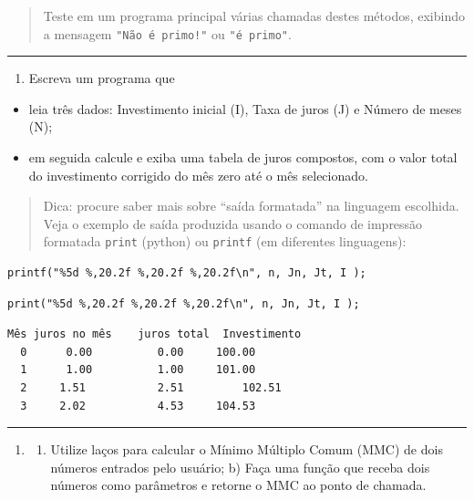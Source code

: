 \documentclass[12pt,a4paper]{article}
\renewcommand{\linethickness}{0.05em}
\providecommand{\tightlist}{%
      \setlength{\itemsep}{0pt}\setlength{\parskip}{0pt}}
\begin{document}
\begin{quote}
Teste em um programa principal várias chamadas destes métodos, exibindo
a mensagem \texttt{"Não\ é\ primo!"} ou \texttt{"é\ primo"}.
\end{quote}

    \begin{center}\rule{0.5\linewidth}{\linethickness}\end{center}

\begin{enumerate}
\def\labelenumi{\arabic{enumi}.}
\setcounter{enumi}{3}
\tightlist
\item
  Escreva um programa que
\end{enumerate}

\begin{itemize}
\tightlist
\item
  leia três dados: Investimento inicial (I), Taxa de juros (J) e Número
  de meses (N);
\item
  em seguida calcule e exiba uma tabela de juros compostos, com o valor
  total do investimento corrigido do mês zero até o mês selecionado.
\end{itemize}

\begin{quote}
Dica: procure saber mais sobre ``saída formatada'' na linguagem
escolhida. Veja o exemplo de saída produzida usando o comando de
impressão formatada \texttt{print} (python) ou \texttt{printf} (em
diferentes linguagens):
\end{quote}

    \begin{verbatim}
printf("%5d %,20.2f %,20.2f %,20.2f\n", n, Jn, Jt, I );
\end{verbatim}

    \begin{verbatim}
print("%5d %,20.2f %,20.2f %,20.2f\n", n, Jn, Jt, I );
\end{verbatim}

    \begin{verbatim}
Mês juros no mês    juros total  Investimento
  0      0.00          0.00     100.00
  1      1.00          1.00     101.00
  2     1.51           2.51         102.51
  3     2.02           4.53     104.53
\end{verbatim}

    \begin{center}\rule{0.5\linewidth}{\linethickness}\end{center}

\begin{enumerate}
\def\labelenumi{\arabic{enumi}.}
\setcounter{enumi}{4}
\item
  \begin{enumerate}
  \def\labelenumii{\alph{enumii})}
  \tightlist
  \item
    Utilize laços para calcular o Mínimo Múltiplo Comum (MMC) de dois
    números entrados pelo usuário; b) Faça uma função que receba dois
    números como parâmetros e retorne o MMC ao ponto de chamada.
  \end{enumerate}
\end{enumerate}
\end{document}
